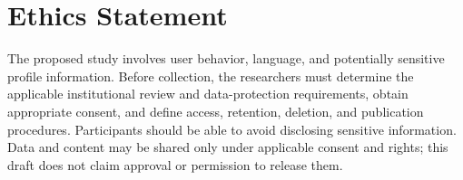 \documentclass[11pt]{article}
\begin{document}
\section*{Ethics Statement}
The proposed study involves user behavior, language, and potentially sensitive profile information. Before collection, the researchers must determine the applicable institutional review and data-protection requirements, obtain appropriate consent, and define access, retention, deletion, and publication procedures. Participants should be able to avoid disclosing sensitive information. Data and content may be shared only under applicable consent and rights; this draft does not claim approval or permission to release them.


\end{document}
